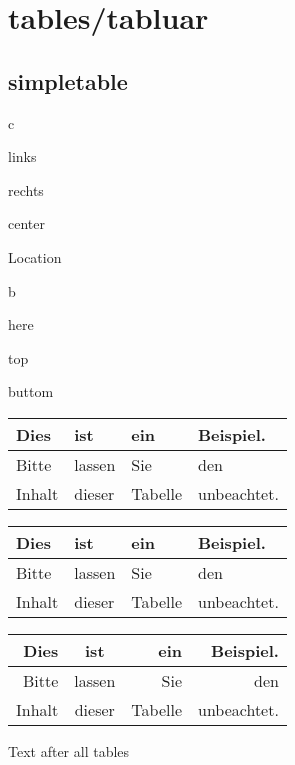 \chapter{tables/tabluar}
\section{simpletable}

\begin{labeling}[ --]{c}
	\item[l] links
	\item[r] rechts
	\item[c] center
\end{labeling}

Location

\begin{labeling}[ --]{b}
	\item[h] here
	\item[t] top
	\item[b] buttom
\end{labeling}


\begin{table}[h]
	\begin{tabular}{l|lll}
		Dies & ist & ein & Beispiel.\\
		\hline
		Bitte & lassen & Sie & den \\
		Inhalt & dieser & Tabelle & unbeachtet.
	\end{tabular}
\end{table}

\begin{table}[t]
	\begin{tabular}{l|lll}
		Dies & ist & ein & Beispiel.\\
		\hline
		Bitte & lassen & Sie & den \\
		Inhalt & dieser & Tabelle & unbeachtet.
	\end{tabular}
\end{table}

\begin{table}[b]
	\begin{tabular}{rcrr}
		Dies & ist & ein & Beispiel.\\
		\hline
		Bitte & lassen & Sie & den \\
		Inhalt & dieser & Tabelle & unbeachtet.
	\end{tabular}
\end{table}

Text after all tables